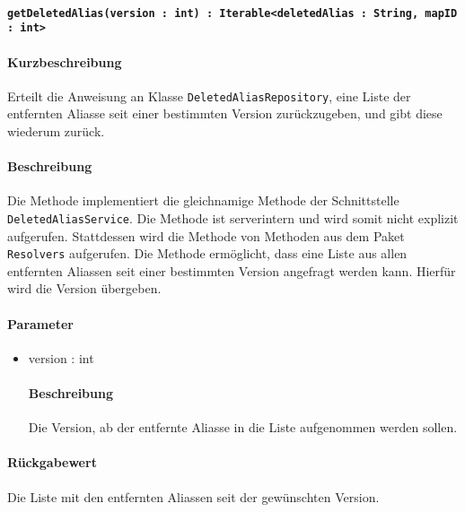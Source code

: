 \paragraph*{\texttt{getDeletedAlias(version : int) : Iterable<deletedAlias : String, mapID : int>}}%
\paragraph*{Kurzbeschreibung}
Erteilt die Anweisung an Klasse \texttt{DeletedAliasRepository}, eine Liste der entfernten Aliasse seit einer bestimmten Version zurückzugeben, und gibt diese wiederum zurück.
\paragraph*{Beschreibung}
Die Methode implementiert die gleichnamige Methode der Schnittstelle \texttt{DeletedAliasService}.
Die Methode ist serverintern und wird somit nicht explizit aufgerufen.
Stattdessen wird die Methode von Methoden aus dem Paket \texttt{Resolvers} aufgerufen.
Die Methode ermöglicht, dass eine Liste aus allen entfernten Aliassen seit einer bestimmten Version angefragt werden kann.
Hierfür wird die Version übergeben.
\paragraph*{Parameter}
\begin{itemize}
    \item version : int
    		\paragraph*{Beschreibung}
    		Die Version, ab der entfernte Aliasse in die Liste aufgenommen werden sollen.
\end{itemize}
\paragraph*{Rückgabewert}
Die Liste mit den entfernten Aliassen seit der gewünschten Version.
